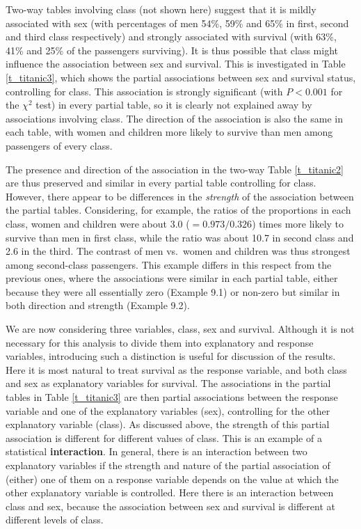 Two-way tables involving class (not shown here)
suggest that it is mildly associated with sex (with percentages of
men 54\%, 59\% and 65\% in first, second and third class respectively)
and strongly associated with survival (with 63\%, 41\% and 25\% of the
passengers surviving). It
is thus possible that class might influence the association between sex and
survival. This is investigated in Table \ref{t_titanic3}, which shows
the partial associations between sex and survival status, controlling
for class. This association is strongly significant (with $P<0.001$ for
the $\chi^{2}$ test) in every partial table, so it is clearly not
explained away by associations involving class. The direction of the
association is also the same in each table, with women and children more
likely to survive than men among passengers of every class.

The presence and direction of the association in the two-way Table
\ref{t_titanic2} are thus preserved and similar in every partial table
controlling for class. However, there appear to be differences in the
\emph{strength} of the association between the partial tables. Considering, for example, the ratios of the proportions in
each class, women and children were about 3.0 ($=0.973/0.326$) times
more likely to survive than men in first class, while the ratio was
about 10.7 in second class and 2.6 in the third. The contrast of
men vs.\ women and children was thus strongest among
second-class passengers. This example differs in this respect from the
previous ones, where the associations were similar in each partial
table, either because they were all essentially zero (Example 9.1) or
non-zero but similar in both direction and strength (Example 9.2).

We are now considering three variables, class, sex and survival.
Although it is not necessary for this analysis to divide them into
explanatory and response variables, introducing such a distinction is
useful for discussion of the results. Here it is most natural to treat
survival as the response variable, and both class and sex as explanatory
variables for survival. The associations in the partial tables in Table
\ref{t_titanic3} are then partial associations between
the response variable and one of the explanatory variables (sex),
controlling for the other explanatory variable (class). As discussed
above, the strength of this partial association is different for
different values of class. This is an example of a statistical
\textbf{interaction}. In general, there is an interaction between two
explanatory variables if the strength and nature of the partial
association of (either) one of them on a response variable depends on
the value at which the other explanatory variable is controlled. Here
there is an interaction between class and sex, because the association
between sex and survival is different at different levels of class.

